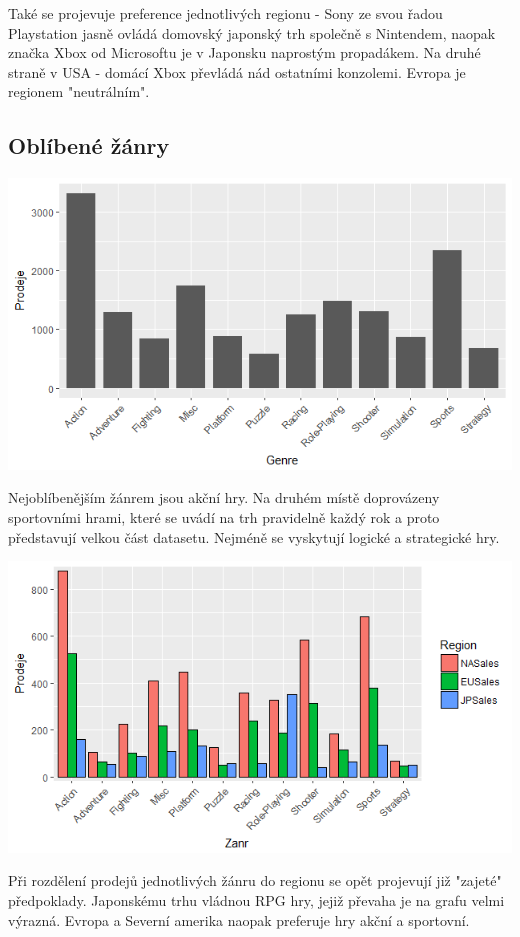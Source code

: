 \documentclass[a4paper,11pt]{article}
\begin{document}
Také se projevuje preference jednotlivých regionu - Sony ze svou řadou Playstation jasně ovládá domovský japonský trh společně s Nintendem, naopak značka Xbox od Microsoftu je v Japonsku naprostým propadákem. Na druhé straně v USA - domácí Xbox převládá nád ostatními konzolemi. Evropa je regionem "neutrálním".

\newpage

\subsection{Oblíbené žánry}


\includegraphics[scale=0.75]{Rplot04}

Nejoblíbenějším žánrem jsou akční hry. Na druhém místě doprovázeny sportovními hrami, které se uvádí na trh pravidelně každý rok a proto představují velkou část datasetu. Nejméně se vyskytují logické a strategické hry.

\includegraphics[scale=0.9]{Rplot06}

Při rozdělení prodejů jednotlivých žánru do regionu se opět projevují již "zajeté" předpoklady. Japonskému trhu vládnou RPG hry, jejiž převaha je na grafu velmi výrazná. Evropa a Severní amerika naopak preferuje hry akční a sportovní.
\end{document}
